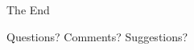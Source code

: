 \documentclass[10pt]{beamer}
\begin{document}

\begin{frame}[allowframebreaks] %
	\begin{center}
		{\Huge The End}
		
		\bigskip\bigskip %
		
		{\LARGE Questions? Comments? Suggestions?}
	\end{center}
\end{frame}

\end{document}

